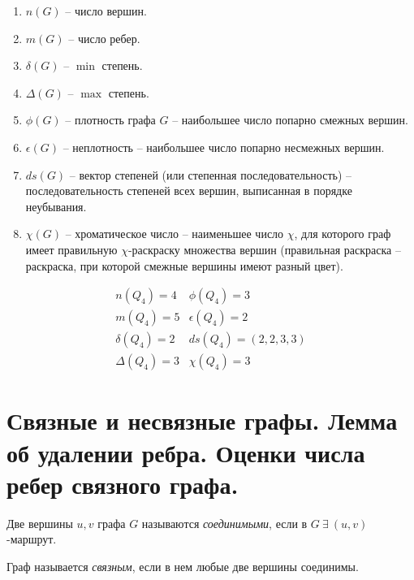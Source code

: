 \begin{example}\leavevmode
    \begin{enumerate}
        \item $ n(G) $ -- число вершин.
        \item $ m(G) $ -- число ребер.
        \item $ \delta(G) $ -- $ \min $ степень.
        \item $ \Delta(G) $ -- $ \max $ степень.
        \item $ \phi(G) $ -- плотность графа $ G $ -- наибольшее число попарно смежных вершин.
        \item $ \epsilon(G) $ -- неплотность -- наибольшее число попарно несмежных вершин.
        \item $ ds(G) $ -- вектор степеней (или степенная последовательность) -- последовательность степеней всех вершин, выписанная в порядке неубывания.
        \item $ \chi(G) $ -- хроматическое число -- наименьшее число $ \chi $, для которого граф имеет правильную $ \chi $-раскраску множества вершин (правильная раскраска -- раскраска, при которой смежные вершины имеют разный цвет).
    \end{enumerate}
    \begin{figure}[H]
        \centering
        \label{fig:fig_17}
    \end{figure}
    \[
        \begin{array}{ll}
            n(Q_4) = 4      & \phi(Q_4) = 3       \\
            m(Q_4) = 5      & \epsilon(Q_4) = 2   \\
            \delta(Q_4) = 2 & ds(Q_4) = (2,2,3,3) \\
            \Delta(Q_4) = 3 & \chi(Q_4) = 3
        \end{array}
    \]
\end{example}

\section{Связные и несвязные графы. Лемма об удалении ребра. Оценки числа ребер связного графа.}

\begin{definition}
    Две вершины $ u,v $ графа $ G $ называются \emph{соединимыми}, если в $ G \ \exists \ (u,v) $-маршрут.

    Граф называется \emph{связным}, если в нем любые две вершины соединимы.
\end{definition}

